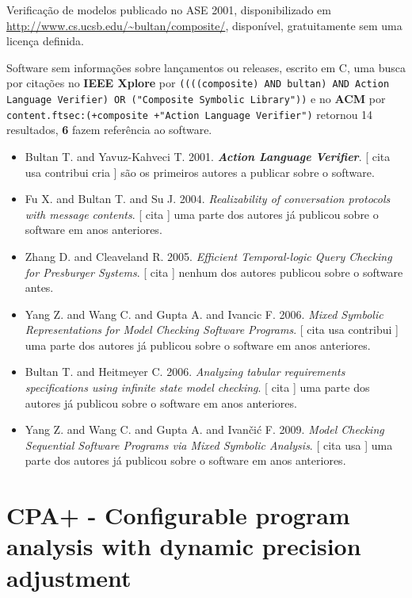 Verificação de modelos
publicado no ASE 2001,
disponibilizado em \url{http://www.cs.ucsb.edu/~bultan/composite/},
disponível,
gratuitamente
sem uma licença definida.

Software sem informações sobre lançamentos ou releases,
escrito em C,
uma busca por citações no {\bf IEEE Xplore} por
\texttt{((((composite) AND bultan) AND Action Language Verifier) OR ("Composite Symbolic Library"))}
e no {\bf ACM} por
\texttt{content.ftsec:(+composite +"Action Language Verifier")}
retornou
14 resultados,
{\bf 6} fazem referência ao software.

\begin{itemize}
\item Bultan T. and Yavuz-Kahveci T.
      2001.
        \textbf{\textit{ Action Language Verifier}}.
      [
          cita
          usa
          contribui
          cria
      ]
são os primeiros autores a publicar sobre o software.
\item Fu X. and Bultan T. and Su J.
      2004.
        \textit{ Realizability of conversation protocols with message contents}.
      [
          cita
      ]
uma parte dos autores já publicou sobre o software em anos anteriores.
\item Zhang D. and Cleaveland R.
      2005.
        \textit{ Efficient Temporal-logic Query Checking for Presburger Systems}.
      [
          cita
      ]
nenhum dos autores publicou sobre o software antes.
\item Yang Z. and Wang C. and Gupta A. and Ivancic F.
      2006.
        \textit{ Mixed Symbolic Representations for Model Checking Software Programs}.
      [
          cita
          usa
          contribui
      ]
uma parte dos autores já publicou sobre o software em anos anteriores.
\item Bultan T. and Heitmeyer C.
      2006.
        \textit{ Analyzing tabular requirements specifications using infinite state model checking}.
      [
          cita
      ]
uma parte dos autores já publicou sobre o software em anos anteriores.
\item Yang Z. and Wang C. and Gupta A. and Ivan\v{c}i\'{c} F.
      2009.
        \textit{ Model Checking Sequential Software Programs via Mixed Symbolic Analysis}.
      [
          cita
          usa
      ]
uma parte dos autores já publicou sobre o software em anos anteriores.
\end{itemize}
\section{CPA+ - Configurable program analysis with dynamic precision adjustment}

